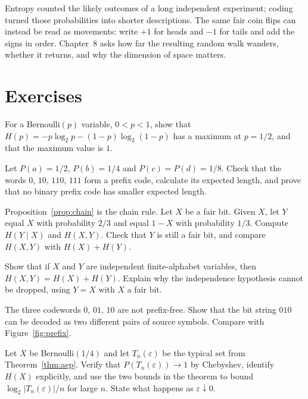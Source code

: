 Entropy counted the likely outcomes of a long independent experiment; coding turned those probabilities into shorter descriptions. The same fair coin flips can instead be read as movements: write $+1$ for heads and $-1$ for tails and add the signs in order. Chapter~8 asks how far the resulting random walk wanders, whether it returns, and why the dimension of space matters.

\section{Exercises}

\begin{exercise}[$\star\star$]\label{ex:entropymax}
For a Bernoulli$(p)$ variable, $0<p<1$, show that $H(p)=-p\log_2 p-(1-p)\log_2(1-p)$ has a maximum at $p=1/2$, and that the maximum value is $1$.
\end{exercise}


\begin{exercise}[$\star$]\label{ex:prefixoptimal}
Let $P(a)=1/2$, $P(b)=1/4$ and $P(c)=P(d)=1/8$. Check that the words $0$, $10$, $110$, $111$ form a prefix code, calculate its expected length, and prove that no binary prefix code has smaller expected length.
\end{exercise}

\begin{exercise}[$\star\star$]\label{ex:entropychain}
Proposition~\ref{prop:chain} is the chain rule. Let $X$ be a fair bit. Given $X$, let $Y$ equal $X$ with probability $2/3$ and equal $1-X$ with probability $1/3$. Compute $H(Y\mid X)$ and $H(X,Y)$. Check that $Y$ is still a fair bit, and compare $H(X,Y)$ with $H(X)+H(Y)$.
\end{exercise}

\begin{exercise}[$\star\star$]\label{ex:entropyproduct}
Show that if $X$ and $Y$ are independent finite-alphabet variables, then $H(X,Y)=H(X)+H(Y)$. Explain why the independence hypothesis cannot be dropped, using $Y=X$ with $X$ a fair bit.
\end{exercise}

\begin{exercise}[$\star$]\label{ex:ambiguouscode}
The three codewords $0$, $01$, $10$ are not prefix-free. Show that the bit string $010$ can be decoded as two different pairs of source symbols. Compare with Figure~\ref{fig:prefix}.
\end{exercise}

\begin{exercise}[$\star\star$]\label{ex:typicalcount}
Let $X$ be Bernoulli$(1/4)$ and let $T_n(\varepsilon)$ be the typical set from Theorem~\ref{thm:aep}. Verify that $P(T_n(\varepsilon))\to1$ by Chebyshev, identify $H(X)$ explicitly, and use the two bounds in the theorem to bound $\log_2|T_n(\varepsilon)|/n$ for large $n$. State what happens as $\varepsilon\downarrow0$.
\end{exercise}



